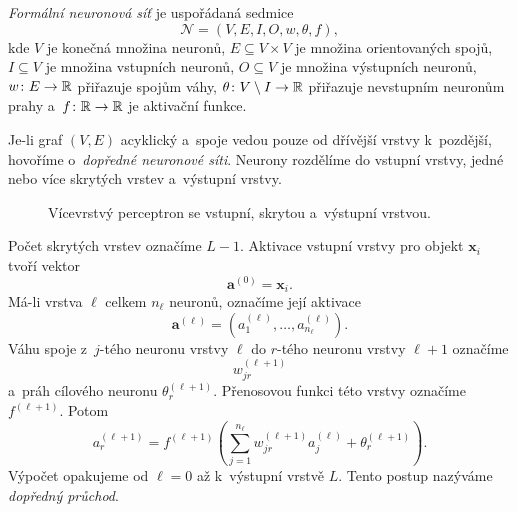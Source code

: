 \begin{definition}\label{def:ai-formalni-sit}
    \emph{Formální neuronová síť} je uspořádaná sedmice
    \[
        \mathcal N=(V,E,I,O,w,\theta,f),
    \]
    kde \(V\) je konečná množina neuronů, \(E\subseteq V\times V\) je množina orientovaných spojů, \(I\subseteq V\) je množina vstupních neuronů, \(O\subseteq V\) je množina výstupních neuronů, \(w\colon E\to\mathbb{R}\) přiřazuje spojům váhy, \(\theta\colon V\setminus I\to\mathbb{R}\) přiřazuje nevstupním neuronům prahy a~\(f\colon\mathbb{R}\to\mathbb{R}\) je aktivační funkce.
\end{definition}

Je-li graf \((V,E)\) acyklický a~spoje vedou pouze od dřívější vrstvy k~pozdější, hovoříme o~\emph{dopředné neuronové síti}. Neurony rozdělíme do vstupní vrstvy, jedné nebo více skrytých vrstev a~výstupní vrstvy.

\begin{figure}[ht]
    \centering
    
    \caption{Vícevrstvý perceptron se vstupní, skrytou a~výstupní vrstvou.}
    \label{fig:ai-mlp}
\end{figure}

Počet skrytých vrstev označíme \(L-1\). Aktivace vstupní vrstvy pro objekt \(\mathbf{x}_i\) tvoří vektor
\[
    \mathbf{a}^{(0)}=\mathbf{x}_i.
\]
Má-li vrstva \(\ell\) celkem \(n_\ell\) neuronů, označíme její aktivace
\[
    \mathbf{a}^{(\ell)}
    =
    \left(
        a_1^{(\ell)},\ldots,a_{n_\ell}^{(\ell)}
    \right).
\]
Váhu spoje z~\(j\)-tého neuronu vrstvy \(\ell\) do \(r\)-tého neuronu vrstvy \(\ell+1\) označíme
\[
    w_{jr}^{(\ell+1)}
\]
a~práh cílového neuronu \(\theta_r^{(\ell+1)}\). Přenosovou funkci této vrstvy označíme \(f^{(\ell+1)}\). Potom
\[
    a_r^{(\ell+1)}
    =
    f^{(\ell+1)}\left(
        \sum_{j=1}^{n_\ell}
        w_{jr}^{(\ell+1)}a_j^{(\ell)}
        +
        \theta_r^{(\ell+1)}
    \right).
\]
Výpočet opakujeme od \(\ell=0\) až k~výstupní vrstvě \(L\). Tento postup nazýváme \emph{dopředný průchod}.

